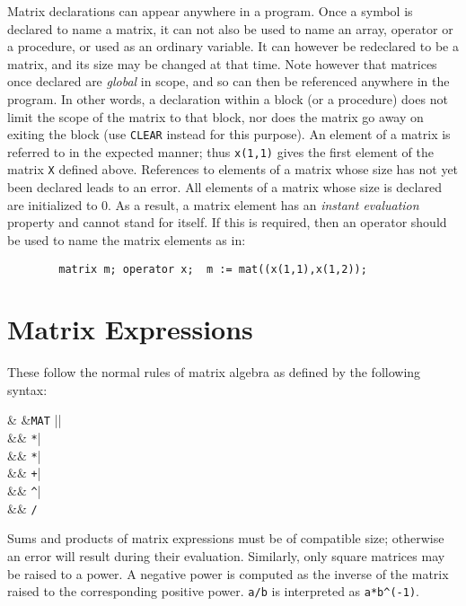 Matrix declarations can appear anywhere in a program. Once a symbol is
declared to name a matrix, it can not also be used to name an array,
operator or a procedure, or used as an ordinary variable. It can however
be redeclared to be a matrix, and its size may be changed at that time.
Note however that matrices once declared are \emph{global} in scope, and so
can then be referenced anywhere in the program.  In other words, a
declaration within a block (or a procedure) does not limit the scope of
the matrix to that block, nor does the matrix go away on exiting the block
(use \texttt{CLEAR} instead for this purpose).  An element of a matrix is
referred to in the expected manner; thus \texttt{x(1,1)} gives the first
element of the matrix \texttt{X} defined above.  References to elements of a
matrix whose size has not yet been declared leads to an error.  All
elements of a matrix whose size is declared are initialized to 0.  As a
result, a matrix element has an \emph{instant evaluation} property and cannot stand for itself.  If this is required,
then an operator should be used to name the matrix elements as in:
\begin{verbatim}
        matrix m; operator x;  m := mat((x(1,1),x(1,2));
\end{verbatim}

\section{Matrix Expressions}
\label{sec:core-matrix-expressions}

These follow the normal rules of matrix algebra as defined by the
following syntax:
\begin{syntaxtable}
     & \bnfprod &\texttt{MAT} || \\
          &&   \texttt{*}| \\
      &&       \texttt{*}| \\
      &&       \texttt{+}| \\
      &&       \texttt{\textasciicircum}| \\
      &&       \texttt{/}
\end{syntaxtable}
Sums and products of matrix expressions must be of compatible size;
otherwise an error will result during their evaluation.  Similarly, only
square matrices may be raised to a power.  A negative power is computed as
the inverse of the matrix raised to the corresponding positive power.
\texttt{a/b} is interpreted as \texttt{a*b\textasciicircum (-1)}.

